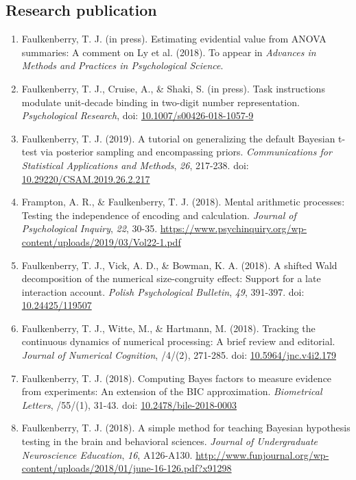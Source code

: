 \documentclass[article,10pt]{article}
\begin{document}
\subsection*{Research publication}
\label{sec:org1b158d2}
\begin{enumerate}
\item Faulkenberry, T. J. (in press). Estimating evidential value from ANOVA summaries: A comment on Ly et al. (2018). To appear in \emph{Advances in Methods and Practices in Psychological Science}.
\item Faulkenberry, T. J., Cruise, A., \& Shaki, S. (in press). Task instructions modulate unit-decade binding in two-digit number representation. \emph{Psychological Research},  doi: \href{https://dx.doi.org/10.1007/s00426-018-1057-9}{10.1007/s00426-018-1057-9}
\item Faulkenberry, T. J. (2019). A tutorial on generalizing the default Bayesian t-test via posterior sampling and encompassing priors. \emph{Communications for Statistical Applications and Methods}, \emph{26}, 217-238. doi: \href{https://doi.org/10.29220/CSAM.2019.26.2.217}{10.29220/CSAM.2019.26.2.217}
\item Frampton, A. R., \& Faulkenberry, T. J. (2018). Mental arithmetic processes: Testing the independence of encoding and calculation. \emph{Journal of Psychological Inquiry}, \emph{22}, 30-35. \url{https://www.psychinquiry.org/wp-content/uploads/2019/03/Vol22-1.pdf}
\item Faulkenberry, T. J., Vick, A. D., \& Bowman, K. A. (2018). A shifted Wald decomposition of the numerical size-congruity effect: Support for a late interaction account. \emph{Polish Psychological Bulletin}, \emph{49}, 391-397. doi: \href{http://dx.doi.org/10.24425/119507}{10.24425/119507}
\item Faulkenberry, T. J., Witte, M., \& Hartmann, M. (2018). Tracking the continuous dynamics of numerical processing: A brief review and editorial. \emph{Journal of Numerical Cognition}, /4/(2), 271-285. doi: \href{http://dx.doi.org/10.5964/jnc.v4i2.179}{10.5964/jnc.v4i2.179}
\item Faulkenberry, T. J. (2018). Computing Bayes factors to measure evidence from experiments: An extension of the BIC approximation. \emph{Biometrical Letters}, /55/(1), 31-43. doi: \href{https://doi.org/10.2478/bile-2018-0003}{10.2478/bile-2018-0003}
\item Faulkenberry, T. J. (2018). A simple method for teaching Bayesian hypothesis testing in the brain and behavioral sciences. \emph{Journal of Undergraduate Neuroscience Education}, \emph{16}, A126-A130. \url{http://www.funjournal.org/wp-content/uploads/2018/01/june-16-126.pdf?x91298}

\end{enumerate}
\end{document}
